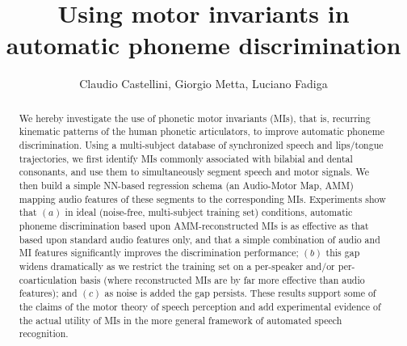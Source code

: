 \documentclass{pnastwo}
\begin{document}

\title{Using motor invariants in automatic phoneme discrimination}

\author{
Claudio Castellini,
Giorgio Metta,
Luciano Fadiga
}


\maketitle

\begin{article}

\begin{abstract}

  We hereby investigate the use of phonetic motor invariants (MIs),
  that is, recurring kinematic patterns of the human phonetic articulators,
  to improve automatic phoneme discrimination. Using a multi-subject
  database of synchronized speech and lips/tongue trajectories, we first
  identify MIs commonly associated with bilabial and dental consonants,
  and use them to simultaneously segment speech and motor signals.
  We then build a simple NN-based regression schema (an Audio-Motor
  Map, AMM) mapping audio features of these segments to the corresponding
  MIs. Experiments show that $(a)$ in ideal (noise-free, multi-subject training set)
  conditions, automatic phoneme discrimination based upon AMM-reconstructed
  MIs is as effective as that based upon standard audio features
  only, and that a simple combination of audio and MI features significantly
  improves the discrimination performance; $(b)$ this gap widens dramatically
  as we restrict the training set on a per-speaker and/or per-coarticulation basis
  (where reconstructed MIs are by far more effective than
  audio features);  and $(c)$ as noise is added the gap persists. These results 
  support some of the claims of the motor theory of speech perception and add 
  experimental evidence of the actual utility of MIs in the more general framework of automated speech recognition.
  


\end{abstract}
\end{article}
\end{document}
